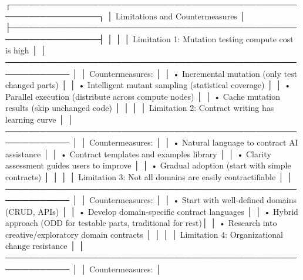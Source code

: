 \documentclass[
]{article}
\newenvironment{Shaded}{}{}
\newcommand{\NormalTok}[1]{#1}
\begin{document}
\begin{Shaded}
\begin{Highlighting}[]
\NormalTok{┌─────────────────────────────────────────────────────────────────┐}
\NormalTok{│                 Limitations and Countermeasures                  │}
\NormalTok{├─────────────────────────────────────────────────────────────────┤}
\NormalTok{│                                                                  │}
\NormalTok{│  Limitation 1: Mutation testing compute cost is high            │}
\NormalTok{│  ─────────────────────────────────────────────────────────────  │}
\NormalTok{│  Countermeasures:                                               │}
\NormalTok{│  • Incremental mutation (only test changed parts)               │}
\NormalTok{│  • Intelligent mutant sampling (statistical coverage)           │}
\NormalTok{│  • Parallel execution (distribute across compute nodes)         │}
\NormalTok{│  • Cache mutation results (skip unchanged code)                 │}
\NormalTok{│                                                                  │}
\NormalTok{│  Limitation 2: Contract writing has learning curve              │}
\NormalTok{│  ─────────────────────────────────────────────────────────────  │}
\NormalTok{│  Countermeasures:                                               │}
\NormalTok{│  • Natural language to contract AI assistance                   │}
\NormalTok{│  • Contract templates and examples library                      │}
\NormalTok{│  • Clarity assessment guides users to improve                   │}
\NormalTok{│  • Gradual adoption (start with simple contracts)               │}
\NormalTok{│                                                                  │}
\NormalTok{│  Limitation 3: Not all domains are easily contractifiable       │}
\NormalTok{│  ─────────────────────────────────────────────────────────────  │}
\NormalTok{│  Countermeasures:                                               │}
\NormalTok{│  • Start with well{-}defined domains (CRUD, APIs)                 │}
\NormalTok{│  • Develop domain{-}specific contract languages                   │}
\NormalTok{│  • Hybrid approach (ODD for testable parts, traditional for rest)│}
\NormalTok{│  • Research into creative/exploratory domain contracts          │}
\NormalTok{│                                                                  │}
\NormalTok{│  Limitation 4: Organizational change resistance                 │}
\NormalTok{│  ─────────────────────────────────────────────────────────────  │}
\NormalTok{│  Countermeasures:                                               │}

\end{Highlighting}
\end{Shaded}
\end{document}
